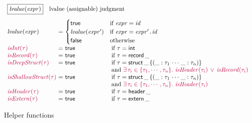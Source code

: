 \documentclass{article}
\newcommand{\ryu}{\color{purple}}
\newcommand{\embox}[1]{\mbox{\emph{#1}}}
\newcommand{\nexpr}{\embox{expr}}
\newcommand{\nid}{\embox{id}}
\newcommand{\tstruct}{\mathsf{struct}}
\newcommand{\theader}{\mathsf{header}}
\newcommand{\textern}{\mathsf{extern}}
\newcommand{\tint}{\mathsf{int}}
\newcommand{\trecord}{\mathsf{record}}
\newcommand{\ttrue}{\mathsf{true}}
\newcommand{\tfalse}{\mathsf{false}}
\newcommand{\tdot}{\mbox{\texttt.}}
\newcommand{\nlvalue}{\embox{lvalue}}
\newcommand{\nisInt}{\embox{isInt}}
\newcommand{\nisExtern}{\embox{isExtern}}
\newcommand{\nisRecord}{\embox{isRecord}}
\newcommand{\nisHeader}{\embox{isHeader}}
\newcommand{\nisDeepStruct}{\embox{isDeepStruct}}
\newcommand{\nisShallowStruct}{\embox{isShallowStruct}}
\begin{document}
\begin{figure}[t]
\[
\begin{array}{l@{~}c@{~}ll}
\lefteqn{\fbox{$\nlvalue(\nexpr)$}\quad\mbox{lvalue (assignable) judgment}}\\[1em]
\nlvalue(\nexpr) &=&
\lefteqn{
\begin{cases}
\ttrue & \text{if } \nexpr = \nid\\
\nlvalue(\nexpr') & \text{if }\nexpr = \nexpr'\tdot\nid \\
\tfalse & \text{otherwise}
\end{cases}
}\\
\ryu\nisInt(\tau) &=& \ttrue\qquad\qquad\quad
& \mbox{if $\tau = \tint$}\\
\ryu\nisRecord(\tau) &=& \ttrue & \mbox{if $\tau = \trecord\, \_$}\\
\ryu\nisDeepStruct(\tau) &=& \ttrue &
    \mbox{if $\tau = \tstruct\, \_\, \{ (\_: \tau_1\, \cdots\, \_: \tau_n)\}$}\\
&&&
\mbox{and \ryu$\exists\, \tau_i \in \{\tau_1, \cdots, \tau_n\}.\ \nisHeader(\tau_i) \,\lor\, \nisRecord(\tau_i)$
}\\
\ryu\nisShallowStruct(\tau) &=& \ttrue &
    \mbox{if $\tau = \tstruct\, \_\, \{ (\_: \tau_1\, \cdots\, \_: \tau_n)\}$}\\
&&&
\mbox{and \ryu$\exists\, \tau_i \in \{\tau_1, \cdots, \tau_n\}.\ \nisHeader(\tau_i)$
}\\
\ryu\nisHeader(\tau) &=& \ttrue & \mbox{if $\tau = \theader\, \_$}\\
\ryu\nisExtern(\tau) &=& \ttrue & \mbox{if $\tau = \textern\, \_$}\\
\end{array}
\]
\caption{Helper functions}
\label{fig:helper}
\end{figure}
\end{document}
